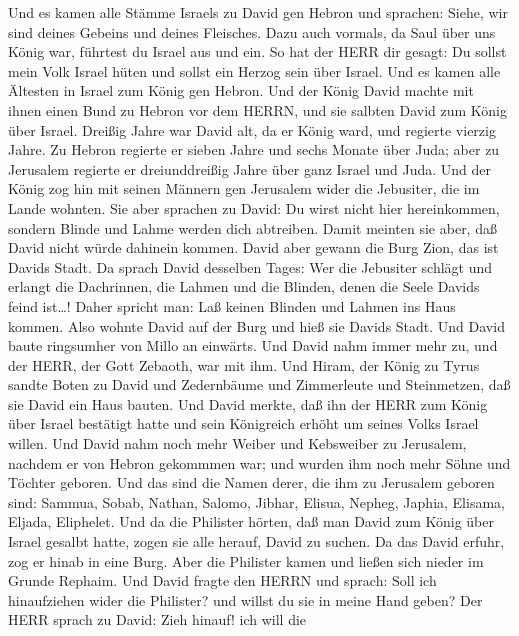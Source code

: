  Und es kamen alle Stämme Israels zu David gen Hebron und
sprachen: Siehe, wir sind deines Gebeins und deines Fleisches.
 Dazu auch vormals, da Saul über uns König war, führtest du
Israel aus und ein. So hat der HERR dir gesagt: Du sollst mein Volk
Israel hüten und sollst ein Herzog sein über Israel.  Und es
kamen alle Ältesten in Israel zum König gen Hebron. Und der König David
machte mit ihnen einen Bund zu Hebron vor dem HERRN, und sie salbten
David zum König über Israel.  Dreißig Jahre war David alt,
da er König ward, und regierte vierzig Jahre.  Zu Hebron
regierte er sieben Jahre und sechs Monate über Juda; aber zu Jerusalem
regierte er dreiunddreißig Jahre über ganz Israel und Juda. 
Und der König zog hin mit seinen Männern gen Jerusalem wider die
Jebusiter, die im Lande wohnten. Sie aber sprachen zu David: Du wirst
nicht hier hereinkommen, sondern Blinde und Lahme werden dich abtreiben.
Damit meinten sie aber, daß David nicht würde dahinein kommen.
 David aber gewann die Burg Zion, das ist Davids Stadt.
 Da sprach David desselben Tages: Wer die Jebusiter schlägt
und erlangt die Dachrinnen, die Lahmen und die Blinden, denen die Seele
Davids feind ist\ldots! Daher spricht man: Laß keinen Blinden und Lahmen
ins Haus kommen.  Also wohnte David auf der Burg und hieß
sie Davids Stadt. Und David baute ringsumher von Millo an einwärts.
 Und David nahm immer mehr zu, und der HERR, der Gott
Zebaoth, war mit ihm.  Und Hiram, der König zu Tyrus sandte
Boten zu David und Zedernbäume und Zimmerleute und Steinmetzen, daß sie
David ein Haus bauten.  Und David merkte, daß ihn der HERR
zum König über Israel bestätigt hatte und sein Königreich erhöht um
seines Volks Israel willen.  Und David nahm noch mehr
Weiber und Kebsweiber zu Jerusalem, nachdem er von Hebron gekommmen war;
und wurden ihm noch mehr Söhne und Töchter geboren.  Und
das sind die Namen derer, die ihm zu Jerusalem geboren sind: Sammua,
Sobab, Nathan, Salomo,  Jibhar, Elisua, Nepheg, Japhia,
 Elisama, Eljada, Eliphelet.  Und da die
Philister hörten, daß man David zum König über Israel gesalbt hatte,
zogen sie alle herauf, David zu suchen. Da das David erfuhr, zog er
hinab in eine Burg.  Aber die Philister kamen und ließen
sich nieder im Grunde Rephaim.  Und David fragte den HERRN
und sprach: Soll ich hinaufziehen wider die Philister? und willst du sie
in meine Hand geben? Der HERR sprach zu David: Zieh hinauf! ich will die
